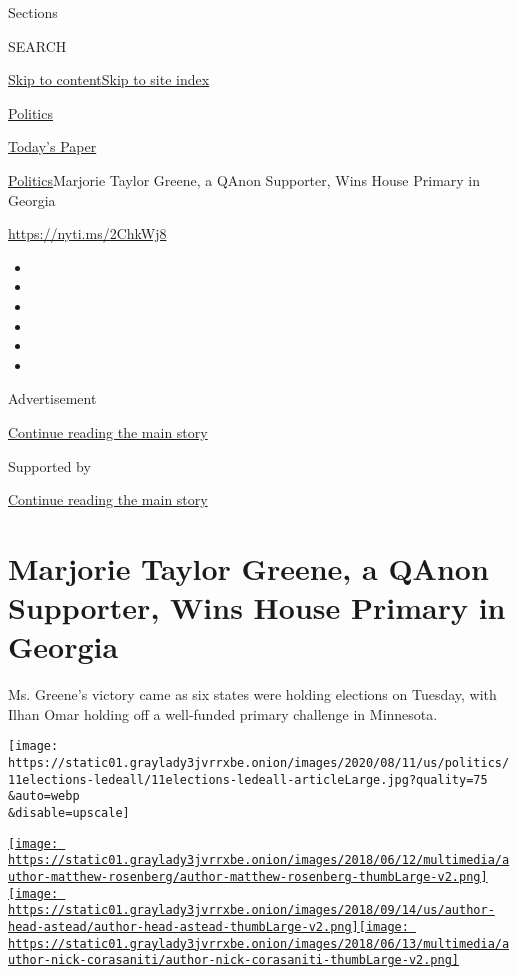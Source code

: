 Sections

SEARCH

\protect\hyperlink{site-content}{Skip to
content}\protect\hyperlink{site-index}{Skip to site index}

\href{https://www.nytimes3xbfgragh.onion/section/politics}{Politics}

\href{https://myaccount.nytimes3xbfgragh.onion/auth/login?response_type=cookie\&client_id=vi}{}

\href{https://www.nytimes3xbfgragh.onion/section/todayspaper}{Today's
Paper}

\href{/section/politics}{Politics}\textbar{}Marjorie Taylor Greene, a
QAnon Supporter, Wins House Primary in Georgia

\url{https://nyti.ms/2ChkWj8}

\begin{itemize}
\item
\item
\item
\item
\item
\item
\end{itemize}

Advertisement

\protect\hyperlink{after-top}{Continue reading the main story}

Supported by

\protect\hyperlink{after-sponsor}{Continue reading the main story}

\hypertarget{marjorie-taylor-greene-a-qanon-supporter-wins-house-primary-in-georgia}{%
\section{Marjorie Taylor Greene, a QAnon Supporter, Wins House Primary
in
Georgia}\label{marjorie-taylor-greene-a-qanon-supporter-wins-house-primary-in-georgia}}

Ms. Greene's victory came as six states were holding elections on
Tuesday, with Ilhan Omar holding off a well-funded primary challenge in
Minnesota.

\texttt{[image: https://static01.graylady3jvrrxbe.onion/images/2020/08/11/us/politics/11elections-ledeall/11elections-ledeall-articleLarge.jpg?quality=75\\\&auto=webp\\\&disable=upscale]}

\href{https://www.nytimes3xbfgragh.onion/by/matthew-rosenberg}{\texttt{[image: https://static01.graylady3jvrrxbe.onion/images/2018/06/12/multimedia/author-matthew-rosenberg/author-matthew-rosenberg-thumbLarge-v2.png]}}\href{https://www.nytimes3xbfgragh.onion/by/astead-w-herndon}{\texttt{[image: https://static01.graylady3jvrrxbe.onion/images/2018/09/14/us/author-head-astead/author-head-astead-thumbLarge-v2.png]}}\href{https://www.nytimes3xbfgragh.onion/by/nick-corasaniti}{\texttt{[image: https://static01.graylady3jvrrxbe.onion/images/2018/06/13/multimedia/author-nick-corasaniti/author-nick-corasaniti-thumbLarge-v2.png]}}

